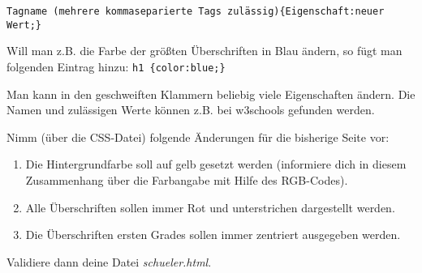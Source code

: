 \lstinline|Tagname (mehrere kommaseparierte Tags zulässig){Eigenschaft:neuer Wert;}|

Will man z.B. die Farbe der größten Überschriften in Blau ändern, so fügt man folgenden Eintrag hinzu: \lstinline|h1 {color:blue;}|

Man kann in den geschweiften Klammern beliebig viele Eigenschaften ändern. Die Namen und zulässigen Werte können z.B. bei w3schools gefunden werden.

\begin{Exercise}[title=, label=CSS2]
    Nimm (über die CSS-Datei) folgende Änderungen für die bisherige Seite vor:
    \begin{enumerate}
        \item Die Hintergrundfarbe soll auf gelb gesetzt werden (informiere dich in diesem Zusammenhang über die Farbangabe mit Hilfe des RGB-Codes).
        \item Alle Überschriften sollen immer Rot und unterstrichen dargestellt werden.
        \item Die Überschriften ersten Grades sollen immer zentriert ausgegeben werden.
    \end{enumerate}
    Validiere dann deine Datei \textit{schueler.html}.
\end{Exercise}


